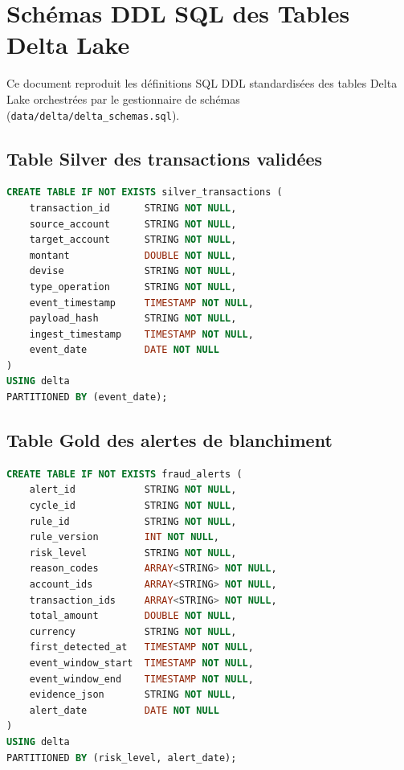 
\chapter{Schémas DDL SQL des Tables Delta Lake}
\label{app:schemas}

Ce document reproduit les définitions SQL DDL standardisées des tables Delta Lake orchestrées par le gestionnaire de schémas (\texttt{data/delta/delta\_schemas.sql}).

\section{Table Silver des transactions validées}

\begin{lstlisting}[language=SQL, caption={Définition DDL de la table \texttt{silver\_transactions}}, label={lst:ddl_silver}]
CREATE TABLE IF NOT EXISTS silver_transactions (
    transaction_id      STRING NOT NULL,
    source_account      STRING NOT NULL,
    target_account      STRING NOT NULL,
    montant             DOUBLE NOT NULL,
    devise              STRING NOT NULL,
    type_operation      STRING NOT NULL,
    event_timestamp     TIMESTAMP NOT NULL,
    payload_hash        STRING NOT NULL,
    ingest_timestamp    TIMESTAMP NOT NULL,
    event_date          DATE NOT NULL
)
USING delta
PARTITIONED BY (event_date);
\end{lstlisting}

\section{Table Gold des alertes de blanchiment}

\begin{lstlisting}[language=SQL, caption={Définition DDL de la table \texttt{fraud\_alerts}}, label={lst:ddl_gold}]
CREATE TABLE IF NOT EXISTS fraud_alerts (
    alert_id            STRING NOT NULL,
    cycle_id            STRING NOT NULL,
    rule_id             STRING NOT NULL,
    rule_version        INT NOT NULL,
    risk_level          STRING NOT NULL,
    reason_codes        ARRAY<STRING> NOT NULL,
    account_ids         ARRAY<STRING> NOT NULL,
    transaction_ids     ARRAY<STRING> NOT NULL,
    total_amount        DOUBLE NOT NULL,
    currency            STRING NOT NULL,
    first_detected_at   TIMESTAMP NOT NULL,
    event_window_start  TIMESTAMP NOT NULL,
    event_window_end    TIMESTAMP NOT NULL,
    evidence_json       STRING NOT NULL,
    alert_date          DATE NOT NULL
)
USING delta
PARTITIONED BY (risk_level, alert_date);
\end{lstlisting}

